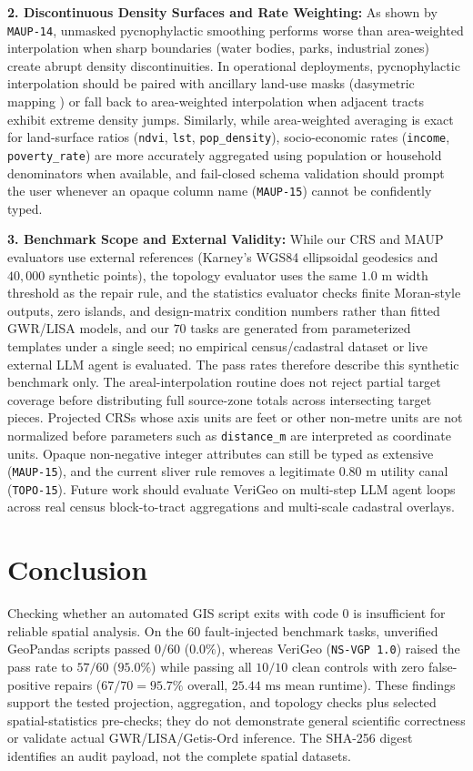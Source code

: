 \documentclass[10pt,twocolumn]{article}
\begin{document}
\textbf{2. Discontinuous Density Surfaces and Rate Weighting:} As shown by \texttt{MAUP-14}, unmasked pycnophylactic smoothing performs worse than area-weighted interpolation when sharp boundaries (water bodies, parks, industrial zones) create abrupt density discontinuities. In operational deployments, pycnophylactic interpolation should be paired with ancillary land-use masks (dasymetric mapping \cite{mennis2003generating}) or fall back to area-weighted interpolation when adjacent tracts exhibit extreme density jumps. Similarly, while area-weighted averaging is exact for land-surface ratios (\texttt{ndvi}, \texttt{lst}, \texttt{pop\_density}), socio-economic rates (\texttt{income}, \texttt{poverty\_rate}) are more accurately aggregated using population or household denominators when available, and fail-closed schema validation should prompt the user whenever an opaque column name (\texttt{MAUP-15}) cannot be confidently typed.

\textbf{3. Benchmark Scope and External Validity:} While our CRS and MAUP evaluators use external references (Karney's WGS84 ellipsoidal geodesics \cite{karney2013algorithms} and $40,000$ synthetic points), the topology evaluator uses the same $1.0\text{ m}$ width threshold as the repair rule, and the statistics evaluator checks finite Moran-style outputs, zero islands, and design-matrix condition numbers rather than fitted GWR/LISA models, and our $70$ tasks are generated from parameterized templates under a single seed; no empirical census/cadastral dataset or live external LLM agent is evaluated. The pass rates therefore describe this synthetic benchmark only. The areal-interpolation routine does not reject partial target coverage before distributing full source-zone totals across intersecting target pieces. Projected CRSs whose axis units are feet or other non-metre units are not normalized before parameters such as \texttt{distance\_m} are interpreted as coordinate units. Opaque non-negative integer attributes can still be typed as extensive (\texttt{MAUP-15}), and the current sliver rule removes a legitimate $0.80\text{ m}$ utility canal (\texttt{TOPO-15}). Future work should evaluate VeriGeo on multi-step LLM agent loops across real census block-to-tract aggregations and multi-scale cadastral overlays.

\section{Conclusion}

Checking whether an automated GIS script exits with code $0$ is insufficient for reliable spatial analysis. On the $60$ fault-injected benchmark tasks, unverified GeoPandas scripts passed $0/60$ ($0.0\%$), whereas VeriGeo (\texttt{NS-VGP 1.0}) raised the pass rate to $57/60$ ($95.0\%$) while passing all $10/10$ clean controls with zero false-positive repairs ($67/70 = 95.7\%$ overall, $25.44\text{ ms}$ mean runtime). These findings support the tested projection, aggregation, and topology checks plus selected spatial-statistics pre-checks; they do not demonstrate general scientific correctness or validate actual GWR/LISA/Getis-Ord inference. The SHA-256 digest identifies an audit payload, not the complete spatial datasets.
\end{document}
